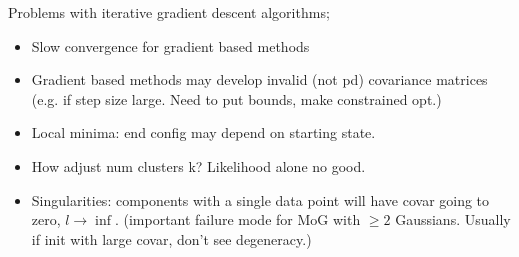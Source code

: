 \documentclass{article}
\begin{document}
Problems with iterative gradient descent algorithms; \begin{itemize} \item Slow convergence for gradient based methods \item Gradient based methods may develop invalid (not pd) covariance matrices (e.g. if step size large. Need to put bounds, make constrained opt.) \item Local minima: end config may depend on starting state.  \item How adjust num clusters k? Likelihood alone no good.  \item Singularities: components with a single data point will have covar going to zero, $l\rightarrow\inf$. (important failure mode for MoG with $\geq 2$ Gaussians. Usually if init with large covar, don't see degeneracy.) \end{itemize}
\end{document}
